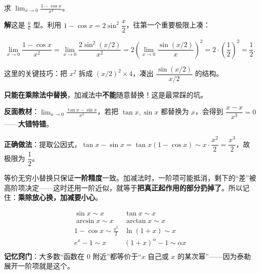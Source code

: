 \documentclass[11pt,a4paper]{article}
\newcommand{\keyw}[1]{\colorbox{cYellowL}{\textbf{\color{cOrange}#1}}}
\begin{document}
\begin{egbox}[重要极限的应用]
求 $\displaystyle\lim_{x\to 0}\frac{1-\cos x}{x^2}$。

\textbf{解}\quad 这是 $\tfrac{0}{0}$ 型。利用 $1-\cos x=2\sin^2\!\dfrac{x}{2}$，往第一个重要极限上凑：
\begin{eqbox}\[ \lim_{x\to 0}\frac{1-\cos x}{x^2}=\lim_{x\to 0}\frac{2\sin^2(x/2)}{x^2}
   =2\left(\lim_{x\to 0}\frac{\sin(x/2)}{x}\right)^{\!2}
   =2\cdot\left(\frac{1}{2}\right)^{\!2}=\boxed{\frac{1}{2}}. \]\end{eqbox}
这里的关键技巧：把 $x^2$ 拆成 $(x/2)^2\times 4$，凑出 $\dfrac{\sin(x/2)}{x/2}$ 的结构。
\end{egbox}

\begin{warnbox}
\begin{pkdot}
  \item \textbf{只能在乘除法中替换}，加减法中\keyw{不能}随意替换！这是最常踩的坑。
  \item \textbf{反面教材}：$\displaystyle\lim_{x\to 0}\frac{\tan x-\sin x}{x^3}$，若把 $\tan x,\sin x$ 都替换为 $x$，会得到 $\dfrac{x-x}{x^3}=0$——\textbf{大错特错}。
  \item \textbf{正确做法}：提取公因式，$\tan x-\sin x=\tan x(1-\cos x)\sim x\cdot\dfrac{x^2}{2}=\dfrac{x^3}{2}$，故极限为 $\dfrac{1}{2}$。
\end{pkdot}
\end{warnbox}

\begin{plainbox}[为什么加减法不能换？]
等价无穷小替换只保证\textbf{一阶精度}一致。加减法时，一阶项可能抵消，剩下的“差”被高阶项决定——这时还用一阶近似，就等于\keyw{把真正起作用的部分扔掉了}。所以记住：\textbf{乘除放心换，加减要小心}。
\end{plainbox}

\begin{tipbox}[常用等价无穷小速查表（$x\to 0$）]
\[
\renewcommand{\arraystretch}{1.5}
\begin{array}{ll}
\sin x\sim x & \tan x\sim x \\
\arcsin x\sim x & \arctan x\sim x \\
1-\cos x\sim \tfrac{x^2}{2} & \ln(1+x)\sim x \\
e^x-1\sim x & (1+x)^{\alpha}-1\sim \alpha x \\
\end{array}
\]
\textbf{记忆窍门}：大多数“函数在 0 附近”都等价于“$x$ 自己或 $x$ 的某次幂”——因为泰勒展开一阶项就是这个。
\end{tipbox}
\end{document}
